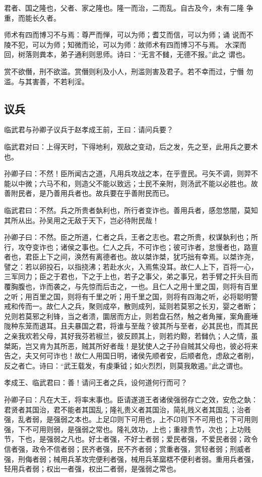 \documentclass[]{article}
\begin{document}
君者、国之隆也，父者、家之隆也。隆一而治，二而乱。自古及今，未有二隆
争重，而能长久者。

师术有四而博习不与焉：尊严而惮，可以为师；耆艾而信，可以为师；诵
说而不陵不犯，可以为师；知微而论，可以为师：故师术有四而博习不与焉。
水深而回，树落则粪本，弟子通利则思师。诗曰：``无言不雠，无德不报。''此之
谓也。

赏不欲僭，刑不欲滥。赏僭则利及小人，刑滥则害及君子。若不幸而过，宁僭
勿滥。与其害善，不若利淫。

\hypertarget{header-n68}{%
\subsection{议兵}\label{header-n68}}

临武君与孙卿子议兵于赵孝成王前，王曰：请问兵要？

临武君对曰：上得天时，下得地利，观敌之变动，后之发，先之至，此用兵之要术也。

孙卿子曰：不然！臣所闻古之道，凡用兵攻战之本，在乎壹民。弓矢不调，则羿不能以中微；六马不和，则造父不能以致远；士民不亲附，则汤武不能以必胜也。故善附民者，是乃善用兵者也。故兵要在乎善附民而已。

临武君曰：不然。兵之所贵者埶利也，所行者变诈也。善用兵者，感忽悠闇，莫知其所从出。孙吴用之无敌于天下，岂必待附民哉！

孙卿子曰：不然。臣之所道，仁者之兵，王者之志也。君之所贵，权谋埶利也；所行，攻夺变诈也；诸侯之事也。仁人之兵，不可诈也；彼可诈者，怠慢者也，路亶者也，君臣上下之间，涣然有离德者也。故以桀诈桀，犹巧拙有幸焉。以桀诈尧，譬之：若以卵投石，以指挠沸；若赴水火，入焉焦没耳。故仁人上下，百将一心，三军同力；臣之于君也，下之于上也，若子之事父，弟之事兄，若手臂之扞头目而覆胸腹也，诈而袭之，与先惊而后击之，一也。且仁人之用十里之国，则将有百里之听；用百里之国，则将有千里之听；用千里之国，则将有四海之听，必将聪明警戒和传而一。故仁人之兵，聚则成卒，散则成列，延则若莫邪之长刃，婴之者断；兑则若莫邪之利锋，当之者溃，圜居而方止，则若盘石然，触之者角摧，案角鹿埵陇种东笼而退耳。且夫暴国之君，将谁与至哉？彼其所与至者，必其民也，而其民之亲我欢若父母，其好我芬若椒兰，彼反顾其上，则若灼黥，若雠仇；人之情，虽桀跖，岂又肯为其所恶，贼其所好者哉！是犹使人之子孙自贼其父母也，彼必将来告之，夫又何可诈也！故仁人用国日明，诸侯先顺者安，后顺者危，虑敌之者削，反之者亡。诗曰：``武王载发，有虔秉钺；如火烈烈，则莫我敢遏。''此之谓也。

孝成王、临武君曰：善！请问王者之兵，设何道何行而可？

孙卿子曰：凡在大王，将率末事也。臣请遂道王者诸侯强弱存亡之效，安危之埶：君贤者其国治，君不能者其国乱；隆礼贵义者其国治，简礼贱义者其国乱；治者强，乱者弱，是强弱之本也。上足卬则下可用也，上不卬则下不可用也；下可用则强，下不可用则弱，是强弱之常也。隆礼效功，上也；重禄贵节，次也；上功贱节，下也，是强弱之凡也。好士者强，不好士者弱；爱民者强，不爱民者弱；政令信者强，政令不信者弱；民齐者强，民不齐者弱；赏重者强，赏轻者弱；刑威者强，刑侮者弱；械用兵革攻完便利者强，械用兵革窳楛不便利者弱。重用兵者强，轻用兵者弱；权出一者强，权出二者弱，是强弱之常也。
\end{document}
